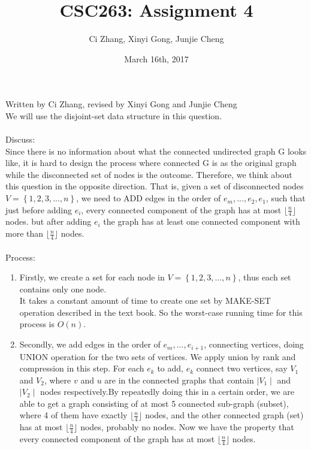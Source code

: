 \documentclass[11pt, answers]{exam}
\newcommand\floor[1]{\lfloor#1\rfloor}
\theoremstyle{plain}
\theoremstyle{definition}
\begin{document}
 


\title{CSC263: Assignment 4}
\date{March 16th, 2017}
\author{Ci Zhang, Xinyi Gong, Junjie Cheng}
\maketitle

\unframedsolutions

\begin{questions}
\question
\begin{solution}Written by Ci Zhang, revised by Xinyi Gong and Junjie Cheng \\
We will use the disjoint-set data structure in this question. \\
\\
Discuss: \\
Since there is no information about what the connected undirected graph G looks like, it is hard to design the process where connected G is as the original graph while the disconnected set of nodes is the outcome. Therefore, we think about this question in the opposite direction. That is, given a set of disconnected nodes $V =\left\{ {1,2,3,...,n}\right\}$, we need to ADD edges in the order of $ e_m,...,e_2,e_1 $, such that just before adding $e_i$, every connected component of the graph has at most $\floor{\frac{n}{4}}$ nodes. but after adding $e_i$ the graph has at least one connected component with more than $\floor{\frac{n}{4}}$ nodes.\\
\\
Process:
\begin{enumerate}
  \item Firstly, we create a set for each node in $V =\left\{ {1,2,3,...,n}\right\}$, thus each set contains only one node.\\
  It takes a constant amount of time to create one set by MAKE-SET operation described in the text book. So the worst-case running time for this process is $O(n)$.
  \item Secondly, we add edges in the order of $ e_m,...,e_{i+1} $, connecting vertices, doing UNION operation for the two sets of vertices. We apply union by rank and compression in this step. For each $e_k$ to add, $e_k$ connect two vertices, say $V_1$ and $V_2$, where $v$ and $u$ are in the connected graphs that contain $\mid V_1\mid$ and $\mid V_2\mid$ nodes respectively.By repeatedly doing this in a certain order, we are able to get a graph consisting of at most 5 connected sub-graph (subset), where 4 of them have exactly $\floor{\frac{n}{4}}$ nodes, and the other connected graph (set) has at most $\floor{\frac{n}{4}}$ nodes, probably no nodes. Now we have the property that every connected component of the graph has at most $\floor{\frac{n}{4}}$ nodes.

\end{enumerate}
\end{solution}
\end{questions}
\end{document}

